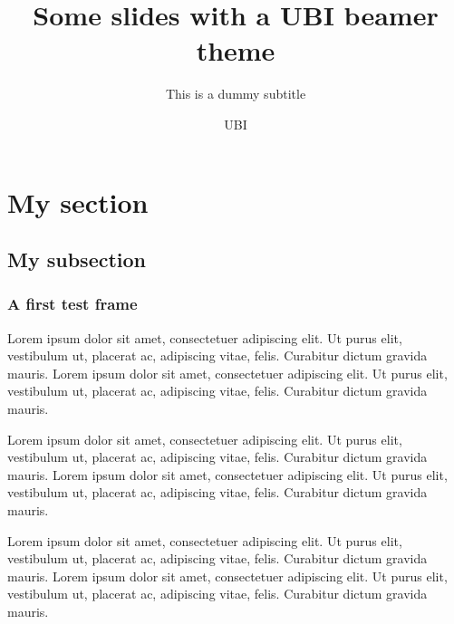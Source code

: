 \documentclass[pdflatex,compress,aspectratio=169]{beamer}
\title{Some slides with a UBI beamer theme}
\subtitle{This is a dummy subtitle}
\author{UBI}
\begin{document}
\maketitle

\section{My section}
\subsection{My subsection}

\begin{frame}
\frametitle{A first test frame}

Lorem ipsum dolor sit amet, consectetuer adipiscing elit. Ut purus
elit, vestibulum ut, placerat ac, adipiscing vitae, felis. Curabitur
dictum gravida mauris.
Lorem ipsum dolor sit amet, consectetuer adipiscing elit. Ut purus
elit, vestibulum ut, placerat ac, adipiscing vitae, felis. Curabitur
dictum gravida mauris.

Lorem ipsum dolor sit amet, consectetuer adipiscing elit. Ut purus
elit, vestibulum ut, placerat ac, adipiscing vitae, felis. Curabitur
dictum gravida mauris.
Lorem ipsum dolor sit amet, consectetuer adipiscing elit. Ut purus
elit, vestibulum ut, placerat ac, adipiscing vitae, felis. Curabitur
dictum gravida mauris.

Lorem ipsum dolor sit amet, consectetuer adipiscing elit. Ut purus
elit, vestibulum ut, placerat ac, adipiscing vitae, felis. Curabitur
dictum gravida mauris.
Lorem ipsum dolor sit amet, consectetuer adipiscing elit. Ut purus
elit, vestibulum ut, placerat ac, adipiscing vitae, felis. Curabitur
dictum gravida mauris.

\end{frame}
\end{document}
